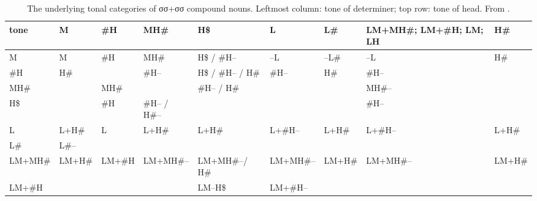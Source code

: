 \begin{refsection}
\begin{subtables}
\begin{sidewaystable}[p]
	\caption{\label{tab:abstractdisyllabicdisyllablesREF}The underlying tonal categories of σσ+σσ compound nouns. Leftmost column: tone of determiner; top row: tone of head. From .}
	{\renewcommand{\arraystretch}{1.65}
		{\fontsize{10}{10.75}\selectfont
			\begin{tabularx}{\textwidth}{ l@{\hspace{16pt}} P{12mm} P{12mm} P{16mm} P{22mm} P{20mm} P{12mm} Q P{12mm} }
				\lsptoprule tone & M & \#H & MH\# & H\$ & L & L\# & LM+MH\#;\hack{\par} LM+\#H;\hack{\par} LM; LH & H\#\\\midrule
				M & M & \#H & MH\# & H\$ / \#H-- & --L & --L\# & --L & H\#\\
				\#H & H\# & \hspace*{\fill} & \#H-- & H\$ / \#H-- / H\# & \#H-- & H\# & \#H-- &\\
				MH\# &  & MH\# & \hspace*{\fill} & \#H-- / H\# &  &  & MH\#-- &\\
				H\$ & \hspace*{\fill} & \#H & \#H-- / H\#-- & \hspace*{\fill} & \hspace*{\fill} & \hspace*{\fill} & \#H-- &  \hspace*{\fill}\\
				L & L+H\# & L & L+H\# & L+H\# & L+\#H-- & L+H\# & L+\#H-- & L+H\#\\
				L\# & L\#-- &  &  &  &  &  &  & \hspace*{\fill}\\
				LM+MH\# & LM+H\# & LM+\#H & LM+MH\#-- & LM+MH\#--/ H\# & LM+MH\#-- & LM+H\# & LM+MH\#-- & LM+H\#\\
				LM+\#H & \hspace*{\fill} &  & \hspace*{\fill} & LM--H\$ & LM+\#H-- & \hspace*{\fill} & \hspace*{\fill} &\\

\end{tabularx}}}
\end{sidewaystable}
\end{subtables}
\end{refsection}

